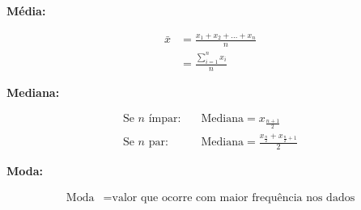\documentclass[preview,10pt]{standalone}
\begin{document}
\textbf{Média:}

\begin{align*}
\bar{x} &= \frac{x_1 + x_2 + \dots + x_n}{n} \\
        &= \frac{\sum_{i=1}^{n} x_i}{n}
\end{align*}

\textbf{Mediana:}

\begin{align*}
\text{Se $n$ ímpar:} \quad & \text{Mediana} = x_{\frac{n+1}{2}} \\
\text{Se $n$ par:} \quad & \text{Mediana} = \frac{x_{\frac{n}{2}} + x_{\frac{n}{2}+1}}{2}
\end{align*}

\textbf{Moda:}

\begin{align*}
\text{Moda} &= \text{valor que ocorre com maior frequência nos dados}
\end{align*}
\end{document}
